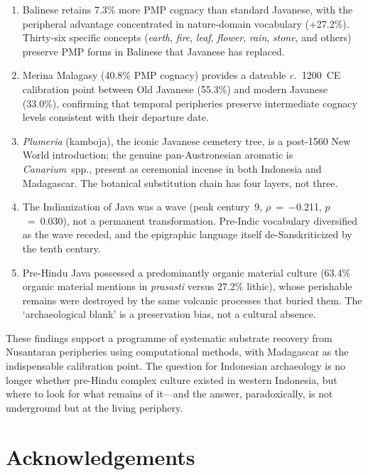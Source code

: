 \documentclass[12pt,a4paper]{article}
\begin{document}
\begin{enumerate}
\item Balinese retains 7.3\% more PMP cognacy than standard Javanese, with the peripheral advantage concentrated in nature-domain vocabulary (+27.2\%). Thirty-six specific concepts (\emph{earth}, \emph{fire}, \emph{leaf}, \emph{flower}, \emph{rain}, \emph{stone}, and others) preserve PMP forms in Balinese that Javanese has replaced.

\item Merina Malagasy (40.8\% PMP cognacy) provides a dateable \textit{c.}~1200~CE calibration point between Old Javanese (55.3\%) and modern Javanese (33.0\%), confirming that temporal peripheries preserve intermediate cognacy levels consistent with their departure date.

\item \emph{Plumeria} (kamboja), the iconic Javanese cemetery tree, is a post-1560 New World introduction; the genuine pan-Austronesian aromatic is \emph{Canarium}~spp., present as ceremonial incense in both Indonesia and Madagascar. The botanical substitution chain has four layers, not three.

\item The Indianization of Java was a wave (peak century~9, $\rho$~=~$-$0.211, $p$~=~0.030), not a permanent transformation. Pre-Indic vocabulary diversified as the wave receded, and the epigraphic language itself de-Sanskriticized by the tenth century.

\item Pre-Hindu Java possessed a predominantly organic material culture (63.4\% organic material mentions in \emph{prasasti} versus 27.2\% lithic), whose perishable remains were destroyed by the same volcanic processes that buried them. The `archaeological blank' is a preservation bias, not a cultural absence.
\end{enumerate}

These findings support a programme of systematic substrate recovery from Nusantaran peripheries using computational methods, with Madagascar as the indispensable calibration point. The question for Indonesian archaeology is no longer whether pre-Hindu complex culture existed in western Indonesia, but where to look for what remains of it---and the answer, paradoxically, is not underground but at the living periphery.

\section*{Acknowledgements}
\end{document}
